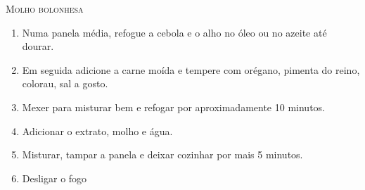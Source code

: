 {	\textsc{Molho bolonhesa}
	\begin{enumerate}
		\item Numa panela média, refogue a cebola e o alho no óleo ou no azeite até
		      dourar.
		\item Em seguida adicione a carne moída e tempere com orégano, pimenta do
		      reino, colorau, sal a gosto.
		\item Mexer para misturar bem e refogar por aproximadamente 10 minutos.
		\item Adicionar o extrato, molho e água.
		\item Misturar, tampar a panela e deixar cozinhar por mais 5 minutos.
		\item Desligar o fogo
	\end{enumerate}

	 }

